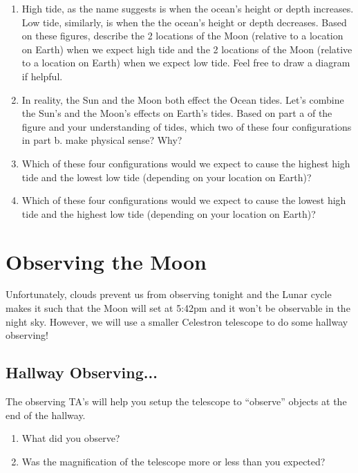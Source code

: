 \documentclass[12pt]{article}%
\begin{document}
\begin{enumerate}
    \item High tide, as the name suggests is when the ocean's height or depth increases. Low tide, similarly, is when the the ocean's height or depth decreases. Based on these figures, describe the 2 locations of the Moon (relative to a location on Earth) when we expect high tide and the 2 locations of the Moon (relative to a location on Earth) when we expect low tide. Feel free to draw a diagram if helpful.

    \item In reality, the Sun and the Moon both effect the Ocean tides. Let's combine the Sun's and the Moon's effects on Earth's tides. Based on part a of the figure and your understanding of tides, which two of these four configurations in part b. make physical sense? Why?
    
    \item Which of these four configurations would we expect to cause the highest high tide and the lowest low tide (depending on your location on Earth)? 
    
    \item Which of these four configurations would we expect to cause the lowest high tide and the highest low tide (depending on your location on Earth)? 
\end{enumerate}


\section{Observing the Moon}
Unfortunately, clouds prevent us from observing tonight and the Lunar cycle makes it such that the Moon will set at 5:42pm and it won't be observable in the night sky. However, we will use a smaller Celestron telescope to do some hallway observing!

\subsection*{Hallway Observing...}
\noindent The observing TA's will help you setup the telescope to ``observe'' objects at the end of the hallway.
\begin{enumerate}

    \item What did you observe? 
    \item Was the magnification of the telescope more or less than you expected?

\end{enumerate}
\end{document}
